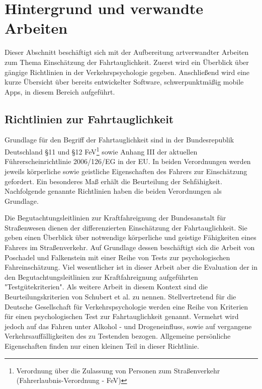 \section{Hintergrund und verwandte Arbeiten}
\label{relatedWork}
Dieser Abschnitt beschäftigt sich mit der Aufbereitung artverwandter Arbeiten zum Thema Einschätzung der Fahrtauglichkeit. Zuerst wird ein Überblick über gängige Richtlinien in der Verkehrspsychologie gegeben. Anschließend wird eine kurze Übersicht über bereits entwickelter Software, schwerpunktmäßig mobile Apps, in diesem Bereich aufgeführt. 

\subsection{Richtlinien zur Fahrtauglichkeit} 

Grundlage für den Begriff der Fahrtauglichkeit sind in der Bundesrepublik Deutschland \S 11 und \S 12 FeV\footnote{\label{foot:fev}Verordnung über die Zulassung von Personen zum Straßenverkehr (Fahrerlaubnis-Verordnung - FeV)} sowie Anhang III der aktuellen Führerscheinrichtlinie 2006/126/EG in der EU. In beiden Verordnungen werden jeweils körperliche sowie geistliche Eigenschaften des Fahrers zur Einschätzung gefordert. Ein besonderes Maß erhält die Beurteilung der Sehfähigkeit. Nachfolgende genannte Richtlinien haben die beiden Verordnungen als Grundlage.

Die Begutachtungsleitlinien zur Kraftfahreignung der Bundesanstalt für Straßenwesen \cite{begutachtungsrichtlinien} dienen der differenzierten Einschätzung der Fahrtauglichkeit. Sie geben einen Überblick über notwendige körperliche und geistige Fähigkeiten eines Fahrers im Straßenverkehr.
Auf Grundlage dessen beschäftigt sich die Arbeit von Poschadel und Falkenstein \cite{testverfahrenpsychometrischefahreignung} mit einer Reihe von Tests zur psychologischen Fahreinschätzung. Viel wesentlicher ist in dieser Arbeit aber die Evaluation der in den Begutachtungsleitlinien zur Kraftfahreignung \cite{begutachtungsrichtlinien} aufgeführten "Testgütekriterien". Als weitere Arbeit in diesem Kontext sind die Beurteilungskriterien von Schubert et al. \cite{beurteilungskriterien} zu nennen. Stellvertretend für die Deutsche Gesellschaft für Verkehrspsychologie werden eine Reihe von Kriterien für einen psychologischen Test zur Fahrtauglichkeit genannt. Vermehrt wird jedoch auf das Fahren unter Alkohol - und Drogeneinfluss, sowie auf vergangene Verkehrsauffälligkeiten des zu Testenden bezogen. Allgemeine persönliche Eigenschaften finden nur einen kleinen Teil in dieser Richtlinie. 

